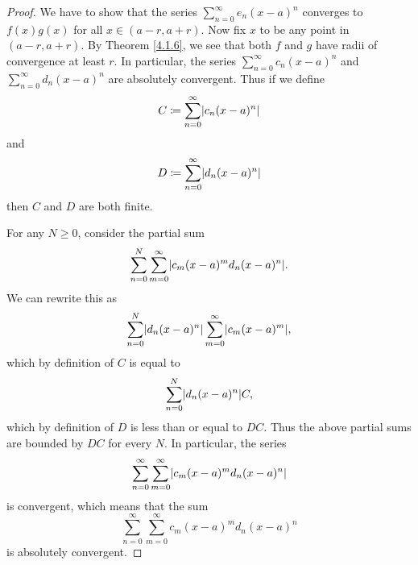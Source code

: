 \begin{proof}
    We have to show that the series \(\sum_{n = 0}^\infty e_n (x - a)^n\) converges to \(f(x) g(x)\) for all \(x \in (a - r, a + r)\).
    Now fix \(x\) to be any point in \((a - r, a + r)\).
    By Theorem \ref{4.1.6}, we see that both \(f\) and \(g\) have radii of convergence at least \(r\).
    In particular, the series \(\sum_{n = 0}^\infty c_n (x - a)^n\) and \(\sum_{n = 0}^\infty d_n (x - a)^n\) are absolutely convergent.
    Thus if we define
    \[
        C \coloneqq \sum_{n = 0}^\infty \abs{c_n (x - a)^n}
    \]
    and
    \[
        D \coloneqq \sum_{n = 0}^\infty \abs{d_n (x - a)^n}
    \]
    then \(C\) and \(D\) are both finite.

    For any \(N \geq 0\), consider the partial sum
    \[
        \sum_{n = 0}^N \sum_{m = 0}^\infty \abs{c_m (x - a)^m d_n (x - a)^n}.
    \]
    We can rewrite this as
    \[
        \sum_{n = 0}^N \abs{d_n (x - a)^n} \sum_{m = 0}^\infty \abs{c_m (x - a)^m},
    \]
    which by definition of \(C\) is equal to
    \[
        \sum_{n = 0}^N \abs{d_n (x - a)^n} C,
    \]
    which by definition of \(D\) is less than or equal to \(DC\).
    Thus the above partial sums are bounded by \(DC\) for every \(N\).
    In particular, the series
    \[
        \sum_{n = 0}^\infty \sum_{m = 0}^\infty \abs{c_m (x - a)^m d_n (x - a)^n}
    \]
    is convergent, which means that the sum
    \[
        \sum_{n = 0}^\infty \sum_{m = 0}^\infty c_m (x - a)^m d_n (x - a)^n
    \]
    is absolutely convergent.


\end{proof}
